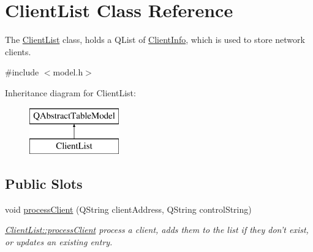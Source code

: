 \hypertarget{class_client_list}{\section{Client\+List Class Reference}
\label{class_client_list}
}


The \hyperlink{class_client_list}{Client\+List} class, holds a Q\+List of \hyperlink{class_client_info}{Client\+Info}, which is used to store network clients.  




{\ttfamily \#include $<$model.\+h$>$}

Inheritance diagram for Client\+List\+:\begin{figure}[H]
\begin{center}
\leavevmode
\includegraphics[height=2.000000cm]{class_client_list}
\end{center}
\end{figure}
\subsection*{Public Slots}
\begin{DoxyCompactItemize}
\item 
void \hyperlink{class_client_list_aa12147bebfba5ea2c293a816105eee13}{process\+Client} (Q\+String client\+Address, Q\+String control\+String)
\begin{DoxyCompactList}\small\item\em \hyperlink{class_client_list_aa12147bebfba5ea2c293a816105eee13}{Client\+List\+::process\+Client} process a client, adds them to the list if they don't exist, or updates an existing entry. \end{DoxyCompactList}\end{DoxyCompactItemize}
